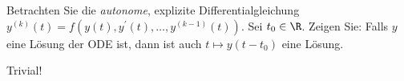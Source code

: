 \begin{exercise}

Betrachten Sie die \textit{autonome}, explizite Differentialgleichung $y^{(k)}(t) = f(y(t), y^\prime(t), \ldots, y^{(k-1)}(t))$. Sei $t_0 \in \R$. Zeigen Sie: Falls $y$ eine Lösung der ODE ist, dann ist auch $t \mapsto y(t - t_0)$ eine Lösung.

\end{exercise}

\begin{solution}

Trivial!

\end{solution}
